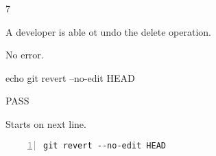 \begin{description}[align=right,leftmargin=3.2cm,labelindent=3.0cm]
\item[Step:] 7
\item[Confirm:] A developer is able ot undo the delete operation.
\item[Expectation:] No error.
\item[Command:] echo git  revert --no-edit HEAD
\item[Test Result:] PASS
\item[Evidence:] Starts on next line.
\end{description}
\begin{lstlisting}[numbers=left]
git revert --no-edit HEAD

\end{lstlisting}
